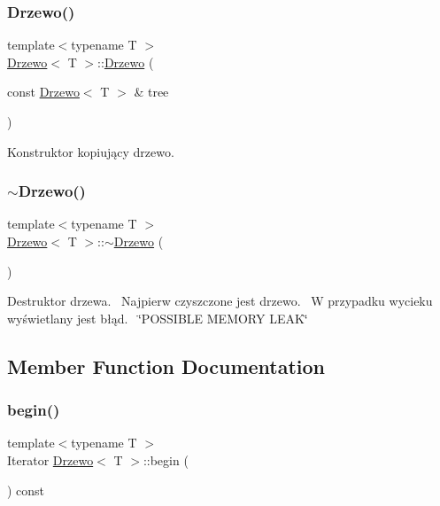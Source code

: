 \subsubsection{\texorpdfstring{Drzewo()}{Drzewo()}\hspace{0.1cm}{\footnotesize\ttfamily [3/3]}}
{\footnotesize\ttfamily template$<$typename T $>$ \\
\hyperlink{class_drzewo}{Drzewo}$<$ T $>$\+::\hyperlink{class_drzewo}{Drzewo} (\begin{DoxyParamCaption}\item[{const \hyperlink{class_drzewo}{Drzewo}$<$ T $>$ \&}]{tree }\end{DoxyParamCaption})\hspace{0.3cm}{\ttfamily [inline]}}

Konstruktor kopiujący drzewo. \mbox{\label{class_drzewo_acbc76af50077660d8a75eaa4e086eac1}} 
\subsubsection{\texorpdfstring{$\sim$\+Drzewo()}{~Drzewo()}}
{\footnotesize\ttfamily template$<$typename T $>$ \\
\hyperlink{class_drzewo}{Drzewo}$<$ T $>$\+::$\sim$\hyperlink{class_drzewo}{Drzewo} (\begin{DoxyParamCaption}{ }\end{DoxyParamCaption})\hspace{0.3cm}{\ttfamily [inline]}}

Destruktor drzewa.~\newline
Najpierw czyszczone jest drzewo.~\newline
W przypadku wycieku wyświetlany jest błąd.~\newline
\char`\"{}\+P\+O\+S\+S\+I\+B\+L\+E M\+E\+M\+O\+R\+Y L\+E\+A\+K\char`\"{} 

\subsection{Member Function Documentation}
\mbox{\label{class_drzewo_a73e93ed5f5c9768143a48f3244bb0b76}} 
\subsubsection{\texorpdfstring{begin()}{begin()}}
{\footnotesize\ttfamily template$<$typename T $>$ \\
Iterator \hyperlink{class_drzewo}{Drzewo}$<$ T $>$\+::begin (\begin{DoxyParamCaption}{ }\end{DoxyParamCaption}) const\hspace{0.3cm}{\ttfamily [inline]}}

